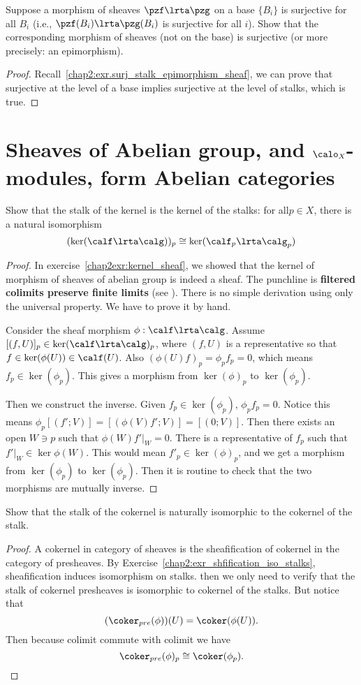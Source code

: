 \begin{exr}
Suppose a morphism of sheaves $\pzf\lrta\pzg$ on a base $\{B_i\}$ is surjective for all $B_i$ (i.e., $\pzf(B_i) \lrta \pzg(B_i)$ is surjective for all $i$). Show that the corresponding morphism of sheaves (not on the base) is surjective (or more precisely: an epimorphism).
\end{exr}
\begin{proof}
Recall~\ref{chap2:exr.surj_stalk_epimorphism_sheaf}, we can prove that surjective at the level of a base implies surjective at the level of stalks, which is true.
\end{proof}




\section{Sheaves of Abelian group, and $\calo_X$-modules, form Abelian categories}
\begin{exr}
Show that the stalk of the kernel is the kernel of the stalks: for all$ p \in  X$, there is a natural isomorphism
$$
(\ker(\calf\lrta \calg))_p\cong \ker (\calf_p\lrta \calg_p)
$$
\end{exr}
\begin{proof}
In exercise~\ref{chap2exr:kernel_sheaf}, we showed that the kernel of morphism of sheaves of abelian group is indeed a sheaf. The punchline is \textbf{filtered colimits preserve finite limits} (see \cite[p.~216]{mac1998categories}). There is no simple derivation using only the universal property. We have to prove it by hand. 

Consider the sheaf morphism $\phi:\calf\lrta \calg$.
Assume $[(f,U)]_p\in \ker(\calf\lrta\calg)_p$, where $(f,U)$ is a representative so that $f\in \ker (\phi(U))\in \calf(U)$.  Also $(\phi(U)f)_p=\phi_pf_p=0$, which means $f_p\in \ker(\phi_p)$. This gives a morphism from $\ker(\phi)_p$ to $\ker(\phi_p)$.

Then we construct the inverse. Given $f_p\in \ker(\phi_p)$, $\phi_pf_p=0$. Notice this means $\phi_p[(f';V)]=[(\phi(V)f';V)]=[(0;V)]$. Then there exists an open $W\ni p$ such that $\phi(W)f'|_W=0$. There is a representative of $f_p$ such that $f'|_W\in\ker \phi(W)$. This would mean $f'_p\in\ker(\phi)_p$, and we get a morphism from $\ker(\phi_p)$ to $\ker(\phi_p)$. Then it is routine to check that the two morphisms are mutually inverse.
\end{proof}

\begin{exr}
Show that the stalk of the cokernel is naturally isomorphic to the cokernel of the stalk.
\end{exr}
\begin{proof}
A cokernel in category of sheaves is the sheafification of cokernel in the category of presheaves. By Exercise~\ref{chap2:exr_shfification_iso_stalks}, sheafification induces isomorphism on stalks. then we only need to verify that the stalk of cokernel presheaves is isomorphic to cokernel of the stalks. But notice that 
$$
(\coker_{pre}(\phi))(U)=\coker(\phi(U)).
$$
Then because colimit commute with colimit we have 
$$
\coker_{pre}(\phi)_p\cong \coker(\phi_p).
$$
\end{proof}


